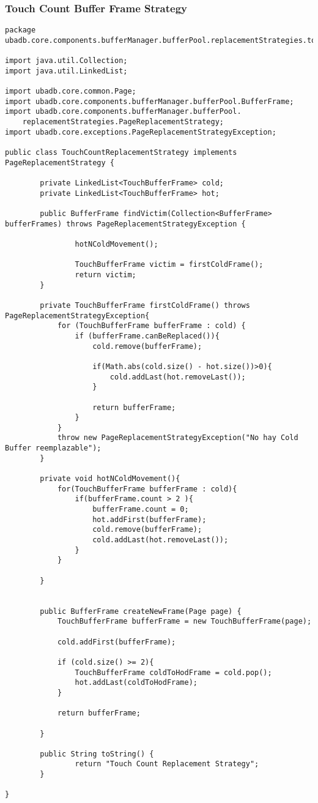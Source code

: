 \subsubsection{Touch Count Buffer Frame Strategy}

\begin{lstlisting}
package ubadb.core.components.bufferManager.bufferPool.replacementStrategies.touchcount;

import java.util.Collection;
import java.util.LinkedList;

import ubadb.core.common.Page;
import ubadb.core.components.bufferManager.bufferPool.BufferFrame;
import ubadb.core.components.bufferManager.bufferPool.
	replacementStrategies.PageReplacementStrategy;
import ubadb.core.exceptions.PageReplacementStrategyException;

public class TouchCountReplacementStrategy implements PageReplacementStrategy {

		private LinkedList<TouchBufferFrame> cold;
		private LinkedList<TouchBufferFrame> hot;
	
        public BufferFrame findVictim(Collection<BufferFrame> bufferFrames) throws PageReplacementStrategyException {
       		
        		hotNColdMovement();
        		
        		TouchBufferFrame victim = firstColdFrame();
                return victim;
        }
        
        private TouchBufferFrame firstColdFrame() throws PageReplacementStrategyException{
        	for (TouchBufferFrame bufferFrame : cold) {
        		if (bufferFrame.canBeReplaced()){
        			cold.remove(bufferFrame);
        			
        			if(Math.abs(cold.size() - hot.size())>0){ 
        				cold.addLast(hot.removeLast());
        			}
        			
        			return bufferFrame;
        		}
        	}
        	throw new PageReplacementStrategyException("No hay Cold Buffer reemplazable");
        }
        
        private void hotNColdMovement(){
        	for(TouchBufferFrame bufferFrame : cold){
        		if(bufferFrame.count > 2 ){ 
        			bufferFrame.count = 0;
        			hot.addFirst(bufferFrame);
        			cold.remove(bufferFrame);
        			cold.addLast(hot.removeLast()); 
        		}
        	}
        	
        }
        

        public BufferFrame createNewFrame(Page page) {
        	TouchBufferFrame bufferFrame = new TouchBufferFrame(page);
        	
        	cold.addFirst(bufferFrame);
        	
        	if (cold.size() >= 2){ 
        		TouchBufferFrame coldToHodFrame = cold.pop();
        		hot.addLast(coldToHodFrame);
        	}
        	
        	return bufferFrame;     
        	
        }
        
        public String toString() {
                return "Touch Count Replacement Strategy";
        }
        
}
\end{lstlisting}
